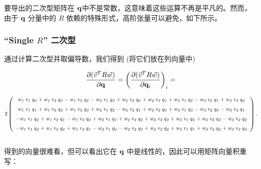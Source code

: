 要导出的二次型矩阵在 $\mathbf{q}$中不是常数，这意味着这些运算不再是平凡的。然而，由于 $\mathbf{q}$ 分量中的 $R$ 依赖的特殊形式，高阶张量可以避免，如下所示。

\subsubsection{``Single $R$'' 二次型}

通过计算二次型并取偏导数，我们得到 (将它们放在列向量中)

\begin{equation*}
\frac{\partial (\vec{v}^TR\vec{w})}{\partial \mathbf{q}} =\left( \frac{\partial (\vec{v}^TR\vec{w})}{\partial \mathbf{q}_i}\right)_i =
\end{equation*}

\footnotesize
$$  2\left( \begin {array}{c} {\it w_1}\,{\it v_1}\,{\it q_0}+{\it w_1}\,{\it v_2}\,{\it q_3}-{\it w_1}\,{\it v_3}\,{\it q_2}-{\it w_2}\,{\it v_1}\,{\it q_3}+{\it w_2}\,{\it v_2}\,{\it q_0}+{\it w_2}\,{\it v_3}\,{\it q_1}+{\it w_3}\,{\it v_1}\,{\it q_2}-{\it w_3}\,{\it v_2}\,{\it q_1}+{\it w_3}\,{\it v_3}\,{\it q_0}\\\noalign{\medskip}{\it w_1}\,{\it v_1}\,{\it q_1}+{\it w_1}\,{\it v_2}\,{\it q_2}+{\it w_1}\,{\it v_3}\,{\it q_3}+{\it w_2}\,{\it v_1}\,{\it q_2}-{\it w_2}\,{\it v_2}\,{\it q_1}+{\it w_2}\,{\it v_3}\,{\it q_0}+{\it w_3}\,{\it v_1}\,{\it q_3}-{\it w_3}\,{\it v_2}\,{\it q_0}-{\it w_3}\,{\it v_3}\,{\it q_1}\\\noalign{\medskip}-{\it w_1}\,{\it v_1}\,{\it q_2}+{\it w_1}\,{\it v_2}\,{\it q_1}-{\it w_1}\,{\it v_3}\,{\it q_0}+{\it w_2}\,{\it v_1}\,{\it q_1}+{\it w_2}\,{\it v_2}\,{\it q_2}+{\it w_2}\,{\it v_3}\,{\it q_3}+{\it w_3}\,{\it v_1}\,{\it q_0}+{\it w_3}\,{\it v_2}\,{\it q_3}-{\it w_3}\,{\it v_3}\,{\it q_2}\\\noalign{\medskip}-{\it w_1}\,{\it v_1}\,{\it q_3}+{\it w_1}\,{\it v_2}\,{\it q_0}+{\it w_1}\,{\it v_3}\,{\it q_1}-{\it w_2}\,{\it v_1}\,{\it q_0}-{\it w_2}\,{\it v_2}\,{\it q_3}+{\it w_2}\,{\it v_3}\,{\it q_2}+{\it w_3}\,{\it v_1}\,{\it q_1}+{\it w_3}\,{\it v_2}\,{\it q_2}+{\it w_3}\,{\it v_3}\,{\it q_3}\end {array} \right) 
 .$$ \normalsize \\

得到的向量很难看，但可以看出它在 $\mathbf{q}$ 中是线性的，因此可以用矩阵向量积重写：

